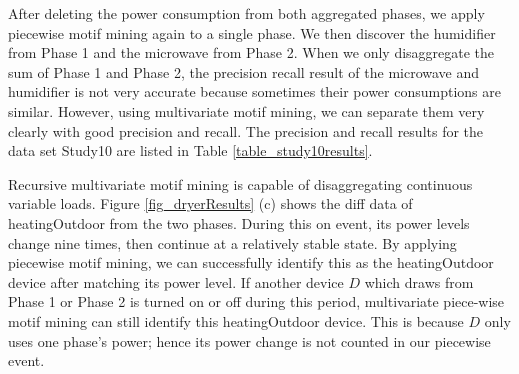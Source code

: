 After deleting the power consumption from both aggregated phases, 
we apply piecewise motif mining again to a single phase. 
We then discover the humidifier from Phase 1 
and the microwave from Phase 2. 
When we only disaggregate the sum of Phase 1 and Phase 2, 
the precision recall result of the microwave and humidifier is not very accurate 
because sometimes their power consumptions are similar. 
However, using multivariate motif mining, we can separate them very clearly 
with good precision and recall. 
The precision and recall results for the data set Study10 are listed in Table \ref{table_study10results}.

Recursive multivariate motif mining is capable of disaggregating continuous variable loads. 
%
Figure \ref{fig_dryerResults} (c) shows the diff data of heatingOutdoor from the two phases. 
During this on event, its power levels change nine times, then continue at a relatively stable state.
By applying piecewise motif mining, 
we can successfully identify this as the heatingOutdoor device 
after matching its power level. 
If another device  $D$ which draws from Phase 1 or Phase 2 is turned on or off during this period, 
multivariate piece-wise motif mining can still identify this heatingOutdoor device. 
This is because $D$ only uses one phase's power; 
hence its power change is not counted in our piecewise event. 
